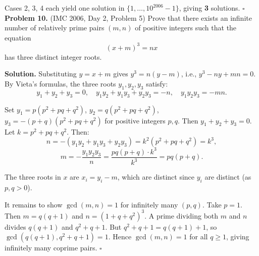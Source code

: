 \documentclass{article}
\begin{document}
Cases 2, 3, 4 each yield one solution in \( \{1, \ldots, 10^{2006} - 1\} \), giving \textbf{3} solutions. \hfill\(\square\)
\\

\textbf{Problem 10.} (IMC 2006, Day 2, Problem 5)
Prove that there exists an infinite number of relatively prime pairs \( (m, n) \) of positive integers such that the equation
\[
(x + m)^3 = nx
\]
has three distinct integer roots.

\textbf{Solution.}
Substituting \( y = x + m \) gives \( y^3 = n(y - m) \), i.e., \( y^3 - ny + mn = 0 \). By Vieta's formulas, the three roots \( y_1, y_2, y_3 \) satisfy:
\[
y_1 + y_2 + y_3 = 0, \quad y_1 y_2 + y_1 y_3 + y_2 y_3 = -n, \quad y_1 y_2 y_3 = -mn.
\]

Set \( y_1 = p(p^2 + pq + q^2) \), \( y_2 = q(p^2 + pq + q^2) \), \( y_3 = -(p+q)(p^2 + pq + q^2) \) for positive integers \( p, q \). Then \( y_1 + y_2 + y_3 = 0 \). Let \( k = p^2 + pq + q^2 \). Then:
\[
n = -(y_1 y_2 + y_1 y_3 + y_2 y_3) = k^2(p^2 + pq + q^2) = k^3,
\]
\[
m = -\frac{y_1 y_2 y_3}{n} = \frac{pq(p+q) \cdot k^3}{k^3} = pq(p+q).
\]

The three roots in \( x \) are \( x_i = y_i - m \), which are distinct since \( y_i \) are distinct (as \( p, q > 0 \)).

It remains to show \( \gcd(m, n) = 1 \) for infinitely many \( (p, q) \). Take \( p = 1 \). Then \( m = q(q+1) \) and \( n = (1 + q + q^2)^3 \). A prime dividing both \( m \) and \( n \) divides \( q(q+1) \) and \( q^2 + q + 1 \). But \( q^2 + q + 1 = q(q+1) + 1 \), so \( \gcd(q(q+1), q^2+q+1) = 1 \). Hence \( \gcd(m, n) = 1 \) for all \( q \geq 1 \), giving infinitely many coprime pairs. \hfill\(\square\)
\end{document}

